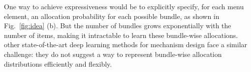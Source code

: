 
One way to achieve expressiveness would be to explicitly specify, for each menu element, an allocation probability for each possible bundle, as shown in Fig.~\ref{fig:idea} (b). But the number of bundles grows exponentially with the number of items, making it intractable to learn these bundle-wise allocations.  other state-of-the-art deep learning methods for mechanism design face a similar challenge: they do not suggest a way to represent bundle-wise allocation distributions efficiently and flexibly.
%

